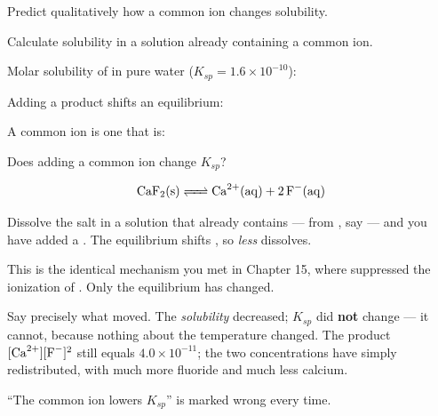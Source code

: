 \documentclass{apchem-notes}
\begin{document}

\begin{objectives}
  \item Predict qualitatively how a common ion changes solubility.
  \item Calculate solubility in a solution already containing a common ion.
\end{objectives}


\begin{warmup}[4]
  \item Molar solubility of  in pure water
        ($K_{sp} = 1.6\times10^{-10}$):
  \item Adding a product shifts an equilibrium:
  \item A common ion is one that is:
  \item Does adding a common ion change $K_{sp}$?
\end{warmup}



\[ \ce{CaF2(s) <=> Ca^2+(aq) + 2F^-(aq)} \]

Dissolve the salt in a solution that already contains  --- from
, say --- and you have added a . The
equilibrium shifts , so \emph{less} 
dissolves.

This is the identical mechanism you met in Chapter 15, where 
suppressed the ionization of . Only the equilibrium has changed.

\begin{apctrap}
Say precisely what moved. The \emph{solubility} decreased; $K_{sp}$ did
\textbf{not} change --- it cannot, because nothing about the temperature
changed. The product $[\ce{Ca^2+}][\ce{F-}]^2$ still equals
$4.0\times10^{-11}$; the two concentrations have simply redistributed, with
much more fluoride and much less calcium.

``The common ion lowers $K_{sp}$'' is marked wrong every time.
\end{apctrap}
\end{document}

